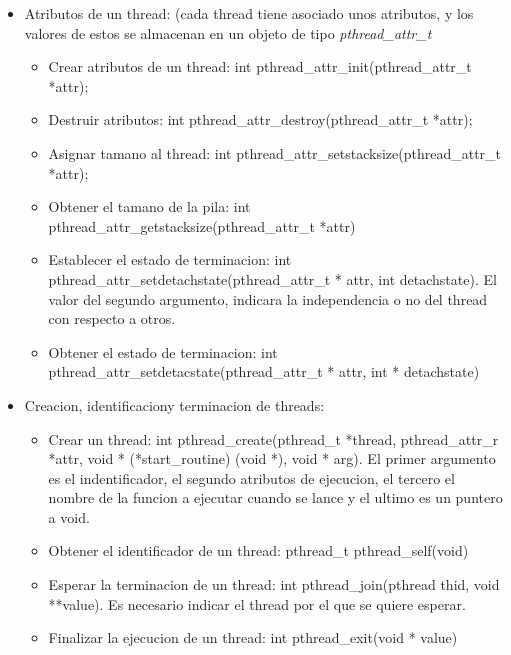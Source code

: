 \documentclass[12pt, letterpaper]{article}
\begin{document}
\begin{itemize}
	\item Atributos de un thread: (cada thread tiene asociado unos atributos, y los valores de estos se almacenan en un objeto de tipo \textit{pthread\_attr\_t}
		\begin{itemize}
			\item Crear atributos de un thread: int pthread\_attr\_init(pthread\_attr\_t *attr);
			\item Destruir atributos: int pthread\_attr\_destroy(pthread\_attr\_t *attr);
			\item Asignar tamano al thread: int pthread\_attr\_setstacksize(pthread\_attr\_t *attr);
			\item Obtener el tamano de la pila: int pthread\_attr\_getstacksize(pthread\_attr\_t *attr)
			\item Establecer el estado de terminacion: int pthread\_attr\_setdetachstate(pthread\_attr\_t * attr, int detachstate). El valor del segundo argumento, indicara la independencia o no del thread con respecto a otros.
			\item Obtener el estado de terminacion: int pthread\_attr\_setdetacstate(pthread\_attr\_t * attr, int * detachstate)
		\end{itemize}
	\item Creacion, identificaciony terminacion de threads:
		\begin{itemize}
			\item Crear un thread: int pthread\_create(pthread\_t *thread, pthread\_attr\_r *attr, void * (*start\_routine) (void *), void * arg). El primer argumento es el indentificador, el segundo atributos de ejecucion, el tercero el nombre de la funcion a ejecutar cuando se lance y el ultimo es un puntero a void.
			\item Obtener el identificador de un thread: pthread\_t pthread\_self(void)
			\item Esperar la terminacion de un thread: int pthread\_join(pthread thid, void **value). Es necesario indicar el thread por el que se quiere esperar.
			\item Finalizar la ejecucion de un thread: int pthread\_exit(void * value)
		\end{itemize}
\end{itemize}
\end{document}
